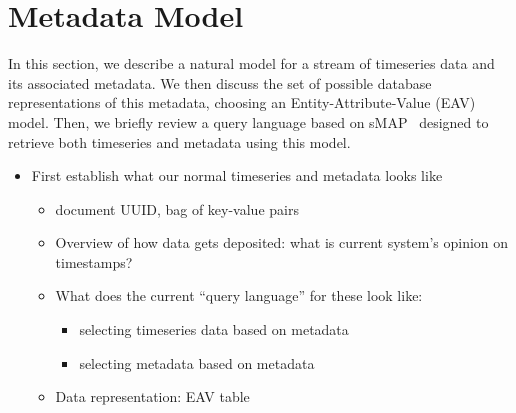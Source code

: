 \section{Metadata Model}

In this section, we describe a natural model for a stream of timeseries data
and its associated metadata. We then discuss the set of possible database
representations of this metadata, choosing an Entity-Attribute-Value
(EAV)~\cite{chen1976entity} model. Then, we briefly review a query language
based on sMAP~\cite{dawson2010smap} designed to retrieve both timeseries and
metadata using this model.

\begin{itemize}
\item First establish what our normal timeseries and metadata looks like
  \begin{itemize}
  \item document UUID, bag of key-value pairs
  \item Overview of how data gets deposited: what is current system's opinion on timestamps?
  \item What does the current ``query language'' for these look like:
      \begin{itemize}
      \item selecting timeseries data based on metadata
      \item selecting metadata based on metadata
      \end{itemize}
  \item Data representation: EAV table
  \end{itemize}
\end{itemize}
